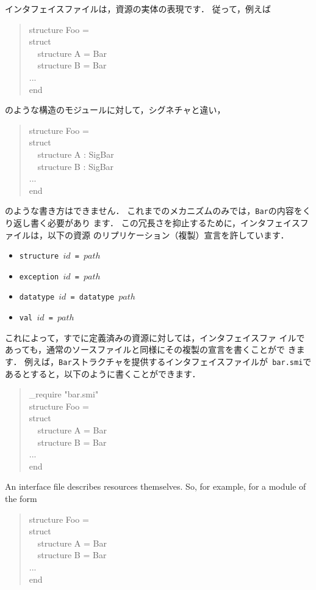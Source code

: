 \documentclass{jbook}
\newif\ifjp
\newcommand{\myem}{\mbox{\ \ }}
\newenvironment{program}{\begin{quote}\begin{tt}}%
                        {\end{tt}\end{quote}}
\begin{document}
\ifjp%
	インタフェイスファイルは，資源の実体の表現です．
	従って，例えば
\begin{program}
structure Foo = \\
struct\\
\myem structure A = Bar\\
\myem structure B = Bar\\
...\\
end

\end{program}
のような構造のモジュールに対して，シグネチャと違い，
\begin{program}
structure Foo = \\
struct\\
\myem structure A : SigBar\\
\myem structure B : SigBar\\
...\\
end
\end{program}
のような書き方はできません．
	これまでのメカニズムのみでは，{\tt Bar}の内容をくり返し書く必要があり
ます．
	この冗長さを抑止するために，インタフェイスファイルは，以下の資源
のリプリケーション（複製）宣言を許しています．
\begin{itemize}
\item {\tt structure $id$ =  $path$}
\item {\tt exception $id$ = $path$}
\item {\tt datatype $id$ = datatype $path$}
\item {\tt val $id$ = $path$}
\end{itemize}
	これによって，すでに定義済みの資源に対しては，インタフェイスファ
イルであっても，通常のソースファイルと同様にその複製の宣言を書くことがで
きます．
	例えば，{\tt Bar}ストラクチャを提供するインタフェイスファイルが{\tt
bar.smi}であるとすると，以下のように書くことができます．
\begin{program}
\_require "bar.smi"\\
structure Foo = \\
struct\\
\myem structure A = Bar\\
\myem structure B = Bar\\
...\\
end
\end{program}
\else%
	An interface file describes resources themselves.
	So, for example, for a module of the form
\begin{program}
structure Foo = \\
struct\\
\myem structure A = Bar\\
\myem structure B = Bar\\
...\\
end

\end{program}
\end{document}
